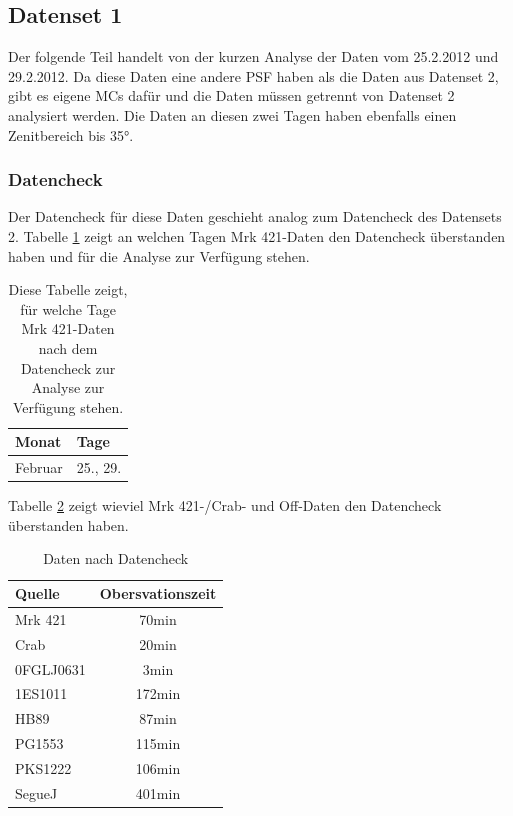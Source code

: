 \FloatBarrier

\subsection{Datenset 1}
\label{subsec:Datenset_1}
Der folgende Teil handelt von der kurzen Analyse der Daten vom 25.2.2012 und 29.2.2012.
Da diese Daten eine andere PSF haben als die Daten aus Datenset 2, gibt es eigene MCs dafür und die Daten müssen getrennt von Datenset 2 analysiert werden.
Die Daten an diesen zwei Tagen haben ebenfalls einen Zenitbereich bis 35°.

\subsubsection{Datencheck}
Der Datencheck für diese Daten geschieht analog zum Datencheck des Datensets 2. 
Tabelle \ref{tab:Datenset1-Mrk421} zeigt an welchen Tagen Mrk 421-Daten den Datencheck überstanden haben und für die Analyse zur Verfügung stehen. 

\begin{table}[!h]
\centering
\caption{Diese Tabelle zeigt, für welche Tage Mrk 421-Daten nach dem Datencheck zur Analyse zur Verfügung stehen.}
\label{tab:Datenset1-Mrk421}
\begin{tabular}{ll}
  \toprule
  Monat & Tage\\
  \midrule
  \midrule
Februar & 25., 29.\\
  \bottomrule
\end{tabular}
\end{table}


Tabelle \ref{tab:Datenset1} zeigt wieviel Mrk 421-/Crab- und Off-Daten den Datencheck überstanden haben.


\begin{table}[!h]
\centering
\caption{Daten nach Datencheck}
\label{tab:Datenset1}
\begin{tabular}{lc}
  \toprule
  Quelle & Obersvationszeit\\
  \midrule
  \midrule
  Mrk 421 & 70min\\
  \midrule
  Crab & 20min\\
  \midrule
  0FGLJ0631 & 3min \\
  1ES1011 & 172min \\
  HB89 & 87min \\
  PG1553 & 115min \\
  PKS1222 & 106min \\
  SegueJ & 401min \\
  \bottomrule
  \bottomrule
\end{tabular}
\end{table}

